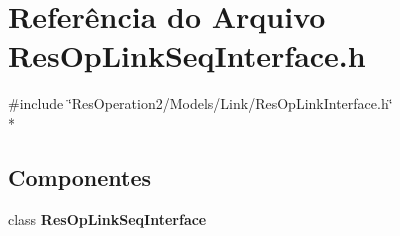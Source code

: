 \section{Referência do Arquivo Res\+Op\+Link\+Seq\+Interface.\+h}
\label{_res_op_link_seq_interface_8h}
{\ttfamily \#include \char`\"{}Res\+Operation2/\+Models/\+Link/\+Res\+Op\+Link\+Interface.\+h\char`\"{}}\\*
\subsection*{Componentes}
\begin{DoxyCompactItemize}
\item 
class {\bf Res\+Op\+Link\+Seq\+Interface}
\end{DoxyCompactItemize}
